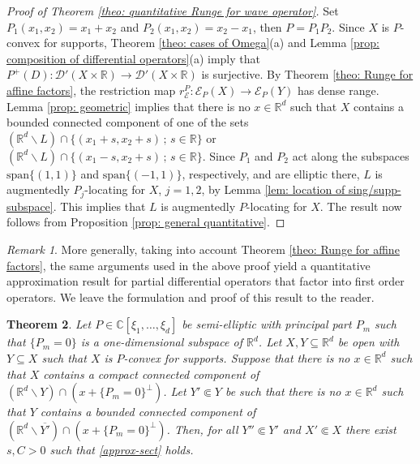 \documentclass[12pt]{amsart}
\newcommand{\R}{\mathbb{R}}
\newcommand{\C}{\mathbb{C}}
\newtheorem{theorem}{Theorem}[section]
\theoremstyle{definition}
\theoremstyle{remark}
\newtheorem{remark}[theorem]{Remark}
\numberwithin{equation}{section}
\begin{document}
\begin{proof}[Proof of  Theorem \ref{theo: quantitative Runge for wave operator}] Set $P_1(x_1,x_2)=x_1+x_2$ and $P_2(x_1,x_2)=x_2-x_1$, then $P=P_1P_2$.
		Since $X$ is $P$-convex for supports, Theorem \ref{theo: cases of Omega}(a) and Lemma \ref{prop: composition of differential operators}(a) imply that $P^+(D): \mathscr{D}'(X\times\R) \to \mathscr{D}'(X\times\R)$ is surjective. By Theorem \ref{theo: Runge for affine factors}, the restriction map $r_\mathscr{E}^P:\mathscr{E}_P(X)\rightarrow\mathscr{E}_P(Y)$ has dense range.   Lemma \ref{prop: geometric} implies  that there is no $x\in\R^d$ such that $X$ contains a bounded connected component of one of the sets  $\left(\R^d\backslash L \right)\cap \{(x_1+s,x_2+s)\,; \,s\in\R\}$ or  $\left(\R^d\backslash L \right)\cap \{(x_1-s,x_2+s)\,; \,s\in\R\}$.  Since $P_1$ and $P_2$ act along the subspaces $\mbox{span}\{(1,1)\}$ and $\mbox{span}\{(-1,1)\}$, respectively, and are elliptic there, $L$ is augmentedly $P_j$-locating for $X$, $j=1,2$, by Lemma \ref{lem: location of sing/supp-subspace}.
		This implies that $L$ is augmentedly $P$-locating for $X$. The result now follows from  Proposition \ref{prop: general quantitative}.	
\end{proof}
\begin{remark}
 More generally, taking into account Theorem \ref{theo: Runge for affine factors},  the same arguments used in the above proof yield a  quantitative approximation result for  partial differential operators that factor into first order operators. We leave the formulation and proof of this result to the reader.
\end{remark}

\begin{theorem}\label{theo: quantitative Runge for single characteristic direction}
		Let $P\in\C[\xi_1,\ldots,\xi_d]$ be semi-elliptic with principal part $P_m$ such that $\{P_m=0\}$ is a one-dimensional subspace of $\R^d$. Let $X,Y\subseteq\R^d$ be open with $Y \subseteq X$ such that $X$ is  $P$-convex for supports. Suppose that there is no $x\in\R^d$ such that $X$ contains a compact connected component of $(\R^d\backslash Y)\cap(x+\{P_m=0\}^\perp)$.  Let $Y'\Subset Y$ be  such that there is no $x\in\R^d$ such that $Y$ contains a bounded connected component of  $(\R^d\backslash\overline{Y'})\cap (x+\{P_m=0\}^\perp)$. Then, for all $Y'' \Subset Y'$ and $X' \Subset X$  there exist $s, C>0$ such that 	\eqref{approx-sect} holds.
\end{theorem}
\end{document}
